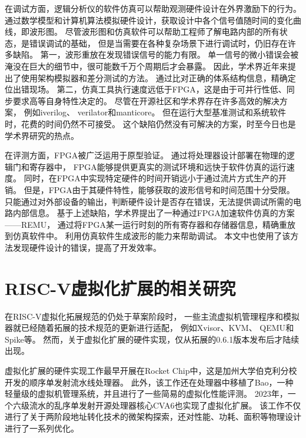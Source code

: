 在调试方面，逻辑分析仪的软件仿真可以帮助观测硬件设计在外界激励下的行为。
通过数学模型和计算机算法模拟硬件设计，获取设计中各个信号值随时间的变化曲线，即波形图。
尽管波形图和仿真软件可以帮助工程师了解电路内部的所有状态，是错误调试的基础，
但是当需要在各种复杂场景下进行调试时，仍旧存在许多缺陷。
第一，波形重放在发现错误信号的能力有限。
单一信号的微小错误会被淹没在巨大的细节中，很可能数千万个周期后才会暴露。
因此，学术界近年来提出了使用架构模拟器和差分测试的方法\cite{micro2022xiangshan}。
通过比对正确的体系结构信息，精确定位出错现场。
第二，仿真工具执行速度远低于FPGA，这是由于可并行性低、同步要求高等自身特性决定的。
尽管在开源社区和学术界存在许多高效的解决方案，
例如iverilog\cite{github:iverilog}、
verilator\cite{github:verilator}和manticore\cite{asplso23manticore}。
但在运行大型基准测试和系统软件时，花费的时间仍然不可接受。
这个缺陷仍然没有可解决的方案，时至今日也是学术界研究的热点。

在评测方面，FPGA被广泛运用于原型验证。
通过将处理器设计部署在物理的逻辑门和寄存器中，
FPGA能够提供更真实的测试环境和远快于软件仿真的运行速度。
同时，在FPGA中实现特定硬件的时间开销远小于通过流片方式生产的开销。
但是，FPGA由于其硬件特性，能够获取的波形信号和时间范围十分受限。
只能通过对外部设备的输出，判断硬件设计是否存在错误，无法提供调试所需的电路内部信息。
基于上述缺陷，学术界提出了一种通过FPGA加速软件仿真的方案——REMU\cite{iccd2023remu}，
通过将FPGA某一运行时刻的所有寄存器和存储器信息，精确重放到仿真软件中。
利用仿真软件生成波形的能力来帮助调试。
本文中也使用了该方法发现硬件设计的错误，提高了开发效率。

\section{RISC-V虚拟化扩展的相关研究}
在RISC-V虚拟化拓展规范的仍处于草案阶段时，
一些主流虚拟机管理程序和模拟器就已经随着拓展的技术规范的更新进行适配，
例如Xvisor\cite{micro2022xiangshan}、KVM\cite{kvm:H-ext}、
QEMU\cite{qemu-riscv:H-ext}和Spike\cite{github:spike}等。
然而，关于虚拟化扩展的硬件实现，仅从拓展的0.6.1版本发布后才陆续出现。

虚拟化扩展的硬件实现工作最早开展在Rocket Chip\cite{itco2022rocket}中，这是加州大学伯克利分校开发的顺序单发射流水线处理器。
此外，该工作还在处理器中移植了Bao，一种轻量级的虚拟机管理系统\cite{ng-res2020bao}，并且进行了一些简易的虚拟化性能评测。
2023年，一个六级流水的乱序单发射开源处理器核心CVA6\cite{tvlsi2023cva6}也实现了虚拟化扩展。
该工作不仅进行了关于两阶段地址转化技术的微架构探索，还对性能、功耗、面积等物理设计进行了一系列优化。

